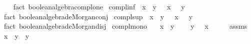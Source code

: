 \begin{isabellebody}
%
\isadelimproof
\ \ %
\endisadelimproof
%
\isatagproof
{}\isamarkupfalse%
\ {\isacharparenleft}{\kern0pt}fact\ boolean{\isacharunderscore}{\kern0pt}algebra{\isachardot}{\kern0pt}compl{\isacharunderscore}{\kern0pt}one{\isacharparenright}{\kern0pt}%
\endisatagproof
{\isafoldproof}%
%
\isadelimproof
\isanewline
%
\endisadelimproof
\isanewline
{}\isamarkupfalse%
\ compl{\isacharunderscore}{\kern0pt}inf{\isacharcolon}{\kern0pt}\ {\isachardoublequoteopen}{\isacharminus}{\kern0pt}\ {\isacharparenleft}{\kern0pt}x\ {\isasymsqinter}\ y{\isacharparenright}{\kern0pt}\ {\isacharequal}{\kern0pt}\ {\isacharminus}{\kern0pt}\ x\ {\isasymsqunion}\ {\isacharminus}{\kern0pt}\ y{\isachardoublequoteclose}\isanewline
%
\isadelimproof
\ \ %
\endisadelimproof
%
\isatagproof
{}\isamarkupfalse%
\ {\isacharparenleft}{\kern0pt}fact\ boolean{\isacharunderscore}{\kern0pt}algebra{\isachardot}{\kern0pt}de{\isacharunderscore}{\kern0pt}Morgan{\isacharunderscore}{\kern0pt}conj{\isacharparenright}{\kern0pt}%
\endisatagproof
{\isafoldproof}%
%
\isadelimproof
\isanewline
%
\endisadelimproof
\isanewline
{}\isamarkupfalse%
\ compl{\isacharunderscore}{\kern0pt}sup{\isacharcolon}{\kern0pt}\ {\isachardoublequoteopen}{\isacharminus}{\kern0pt}\ {\isacharparenleft}{\kern0pt}x\ {\isasymsqunion}\ y{\isacharparenright}{\kern0pt}\ {\isacharequal}{\kern0pt}\ {\isacharminus}{\kern0pt}\ x\ {\isasymsqinter}\ {\isacharminus}{\kern0pt}\ y{\isachardoublequoteclose}\isanewline
%
\isadelimproof
\ \ %
\endisadelimproof
%
\isatagproof
{}\isamarkupfalse%
\ {\isacharparenleft}{\kern0pt}fact\ boolean{\isacharunderscore}{\kern0pt}algebra{\isachardot}{\kern0pt}de{\isacharunderscore}{\kern0pt}Morgan{\isacharunderscore}{\kern0pt}disj{\isacharparenright}{\kern0pt}%
\endisatagproof
{\isafoldproof}%
%
\isadelimproof
\isanewline
%
\endisadelimproof
\isanewline
{}\isamarkupfalse%
\ compl{\isacharunderscore}{\kern0pt}mono{\isacharcolon}{\kern0pt}\isanewline
\ \ \ {\isachardoublequoteopen}x\ {\isasymle}\ y{\isachardoublequoteclose}\isanewline
\ \ \ {\isachardoublequoteopen}{\isacharminus}{\kern0pt}\ y\ {\isasymle}\ {\isacharminus}{\kern0pt}\ x{\isachardoublequoteclose}\isanewline
%
\isadelimproof
%
\endisadelimproof
%
\isatagproof
{}\isamarkupfalse%
\ {\isacharminus}{\kern0pt}\isanewline
\ \ \isamarkupfalse%
\ assms\ \isamarkupfalse%
\ {\isachardoublequoteopen}x\ {\isasymsqunion}\ y\ {\isacharequal}{\kern0pt}\ y{\isachardoublequoteclose}\ \isamarkupfalse%

\end{isabellebody}
